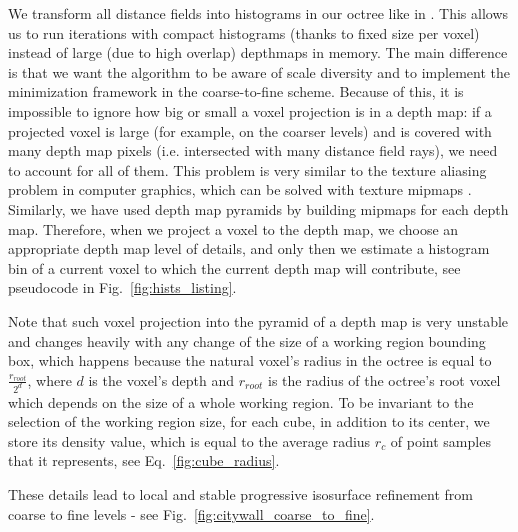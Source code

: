 \documentclass[10pt,twocolumn,letterpaper]{article}
\begin{document}
We transform all distance fields into histograms in our octree like in \cite{zach2007globally}. This allows us
to run iterations with compact histograms \cite{zach2008fast} (thanks to fixed size per voxel) instead of large (due to high overlap) depthmaps \cite{zach2007globally} in memory.
The main difference is that we want the algorithm to be aware of scale diversity and to implement the minimization framework in the coarse-to-fine scheme. Because of this, it is impossible to ignore how big or small a voxel projection is in a depth map: if a projected voxel is large (for example, on the coarser levels) and is covered with many depth map pixels (i.e. intersected with many distance field rays), we need to account for all of them. This problem is very similar to the texture aliasing problem in computer graphics, which can be solved
with texture mipmaps \cite{williams1983pyramidal}. Similarly, we have used depth map pyramids by building mipmaps for each depth map. Therefore, when we
project a voxel to the depth map, we choose an appropriate depth map level of details, and only then we estimate a histogram bin of a current voxel to which the current depth map will contribute,
see pseudocode in Fig.~\ref{fig:hists_listing}.

Note that such voxel projection into the pyramid of a depth map is very unstable and changes heavily with any change of the size of a working region bounding box, which happens because the natural voxel's radius in the octree is equal to $\frac{r_{root}}{2^{d}}$, where $d$ is the voxel's depth and $r_{root}$ is
the radius of the octree's root voxel which depends on the size of a whole working region. To be invariant to the selection of the working region size,
for each cube, in addition to its center, we store its density value, which is equal to the average radius $r_c$ of point samples that it represents, see Eq.~\ref{fig:cube_radius}.

These details lead to local and stable progressive isosurface refinement from coarse to fine levels - see Fig.~\ref{fig:citywall_coarse_to_fine}.
\end{document}
